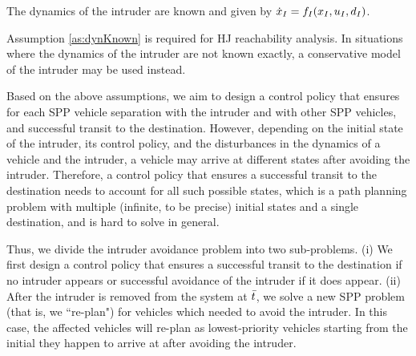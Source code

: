 \begin{assumption}
\label{as:dynKnown}
The dynamics of the intruder are known and given by $\dot{x}_I = f_I(x_I, u_I, d_I)$.
\end{assumption}

Assumption \ref{as:dynKnown} is required for HJ reachability analysis. In situations where the dynamics of the intruder are not known exactly, a conservative model of the intruder may be used instead.

Based on the above assumptions, we aim to design a control policy that ensures for each SPP vehicle separation with the intruder and with other SPP vehicles, and successful transit to the destination. However, depending on the initial state of the intruder, its control policy, and the disturbances in the dynamics of a vehicle and the intruder, a vehicle may arrive at different states after avoiding the intruder. Therefore, a control policy that ensures a successful transit to the destination needs to account for all such possible states, which is a path planning problem with multiple (infinite, to be precise) initial states and a single destination, and is hard to solve in general. 

Thus, we divide the intruder avoidance problem into two sub-problems. (i) We first design a control policy that ensures a successful transit to the destination if no intruder appears or successful avoidance of the intruder if it does appear. (ii) After the intruder is removed from the system at $\bar{t}$, we solve a new SPP problem (that is, we ``re-plan") for vehicles which needed to avoid the intruder. In this case, the affected vehicles will re-plan as lowest-priority vehicles starting from the initial they happen to arrive at after avoiding the intruder. 

